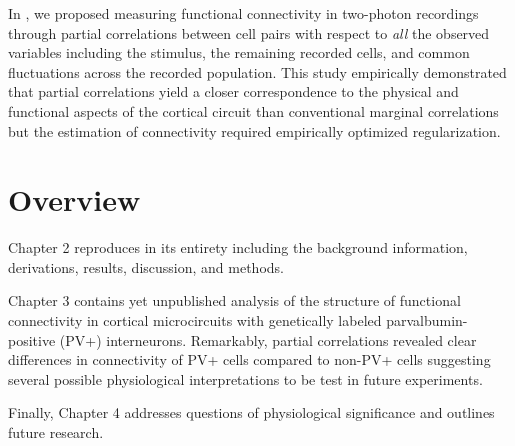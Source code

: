 In \cite{Yatsenko:2014}, we proposed measuring functional connectivity in two-photon recordings through partial correlations between cell pairs with respect to \emph{all} the observed variables including the stimulus, the remaining recorded cells, and common fluctuations across the recorded population. 
This study empirically demonstrated that partial correlations yield a closer correspondence to the physical and functional aspects of the cortical circuit than conventional marginal correlations but the estimation of connectivity required empirically optimized regularization.

\section{Overview}
Chapter 2 reproduces \cite{Yatsenko:2014} in its entirety including the background information, derivations, results, discussion, and methods. 

Chapter 3 contains yet unpublished analysis of the structure of functional connectivity in cortical microcircuits with genetically labeled parvalbumin-positive (PV+) interneurons. Remarkably, partial correlations revealed clear differences in connectivity of PV+ cells compared to non-PV+ cells suggesting several possible physiological interpretations to be test in future experiments.

Finally, Chapter 4 addresses questions of physiological significance and outlines future research.
